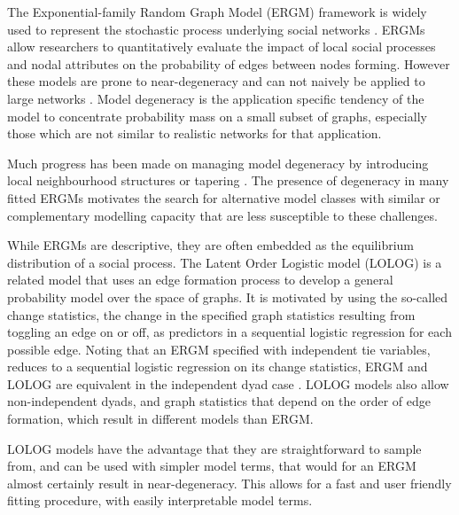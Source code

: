 \documentclass[
]{statsoc}
\begin{document}
The Exponential-family Random Graph Model (ERGM) framework is widely
used to represent the stochastic process underlying social networks
\citep{FrankStrauss1986,Hunter2006}. ERGMs allow researchers to
quantitatively evaluate the impact of local social processes and nodal
attributes on the probability of edges between nodes forming. However
these models are prone to near-degeneracy \citep{Handcock2003} and can
not naively be applied to large networks
\citep{schweinberger2011,chatterjee2013}. Model degeneracy is the
application specific tendency of the model to concentrate probability
mass on a small subset of graphs, especially those which are not similar
to realistic networks for that application.

Much progress has been made on managing model degeneracy by introducing
local neighbourhood structures \citep{schweinbergerhandcock2015} or
tapering \citep{fellowshandcock2017}. The presence of degeneracy in many
fitted ERGMs motivates the search for alternative model classes with
similar or complementary modelling capacity that are less susceptible to
these challenges.

While ERGMs are descriptive, they are often embedded as the equilibrium
distribution of a social process. The Latent Order Logistic model
(LOLOG) \citep{Fellows2018} is a related model that uses an edge
formation process to develop a general probability model over the space
of graphs. It is motivated by using the so-called change statistics, the
change in the specified graph statistics resulting from toggling an edge
on or off, as predictors in a sequential logistic regression for each
possible edge. Noting that an ERGM specified with independent tie
variables, reduces to a sequential logistic regression on its change
statistics, ERGM and LOLOG are equivalent in the independent dyad case
\citep{Fellows2018}. LOLOG models also allow non-independent dyads, and
graph statistics that depend on the order of edge formation, which
result in different models than ERGM.

LOLOG models have the advantage that they are straightforward to sample
from, and can be used with simpler model terms, that would for an ERGM
almost certainly result in near-degeneracy. This allows for a fast and
user friendly fitting procedure, with easily interpretable model terms.
\end{document}
